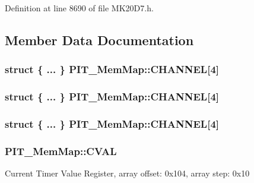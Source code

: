 Definition at line 8690 of file M\+K20\+D7.\+h.



\subsection{Member Data Documentation}
\subsubsection[{\texorpdfstring{C\+H\+A\+N\+N\+EL}{CHANNEL}}]{\setlength{\rightskip}{0pt plus 5cm}struct \{ ... \}   P\+I\+T\+\_\+\+Mem\+Map\+::\+C\+H\+A\+N\+N\+EL\mbox{[}4\mbox{]}}\hypertarget{struct_p_i_t___mem_map_aa7a105b8dca38d6f5e0e51d796012bca}{}\label{struct_p_i_t___mem_map_aa7a105b8dca38d6f5e0e51d796012bca}
\subsubsection[{\texorpdfstring{C\+H\+A\+N\+N\+EL}{CHANNEL}}]{\setlength{\rightskip}{0pt plus 5cm}struct \{ ... \}   P\+I\+T\+\_\+\+Mem\+Map\+::\+C\+H\+A\+N\+N\+EL\mbox{[}4\mbox{]}}\hypertarget{struct_p_i_t___mem_map_a778c6f29ecaa2318d34e207de33609a5}{}\label{struct_p_i_t___mem_map_a778c6f29ecaa2318d34e207de33609a5}
\subsubsection[{\texorpdfstring{C\+H\+A\+N\+N\+EL}{CHANNEL}}]{\setlength{\rightskip}{0pt plus 5cm}struct \{ ... \}   P\+I\+T\+\_\+\+Mem\+Map\+::\+C\+H\+A\+N\+N\+EL\mbox{[}4\mbox{]}}\hypertarget{struct_p_i_t___mem_map_a71809d1da7af7689c1171788e023b6ef}{}\label{struct_p_i_t___mem_map_a71809d1da7af7689c1171788e023b6ef}
\subsubsection[{\texorpdfstring{C\+V\+AL}{CVAL}}]{ P\+I\+T\+\_\+\+Mem\+Map\+::\+C\+V\+AL}\hypertarget{struct_p_i_t___mem_map_a7d3d1a5913a28cfb4ca0e120ebf37087}{}\label{struct_p_i_t___mem_map_a7d3d1a5913a28cfb4ca0e120ebf37087}
Current Timer Value Register, array offset\+: 0x104, array step\+: 0x10 

